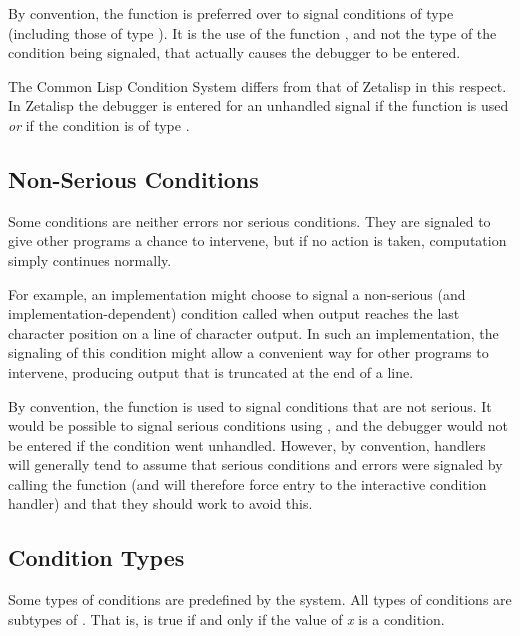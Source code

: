By convention, the function  is preferred over  to signal conditions
of type  (including those of type ). It is the use of
the function , and not the type of the condition being signaled, that
actually causes the debugger to be entered.

\beforenoterule
\begin{incompatibility}
The Common Lisp Condition System differs from that of Zeta{}lisp in this respect.
In Zetalisp the debugger is entered for an unhandled signal if the 
function is used \emph{or} if the condition is of type .
\end{incompatibility}
\afternoterule

\subsection{Non-Serious Conditions}

Some conditions are neither errors nor serious conditions. They are signaled
to give other programs a chance to intervene, but if no action is taken,
computation simply continues normally.

For example, an implementation might choose to signal a non-serious (and
implementation-dependent) condition
called  when output reaches the last character position on a line
of character output. In such an implementation, the signaling of this
condition might allow a convenient way for other programs to intervene,
producing output that is truncated at the end of a line.

By convention, the function  is used to signal conditions that are not
serious. It would be possible to signal serious conditions using , and
the debugger would not be entered if the condition went unhandled.  However,
by convention,
handlers will generally tend to assume that serious conditions and errors
were signaled by calling the  function (and will therefore
force entry to the interactive condition handler) and that they should
work to avoid this.


\subsection{Condition Types}

Some types of conditions are predefined by the system. All types of conditions
are subtypes of . That is,  is true if
and only if the value of \emph{x} is a condition. 

